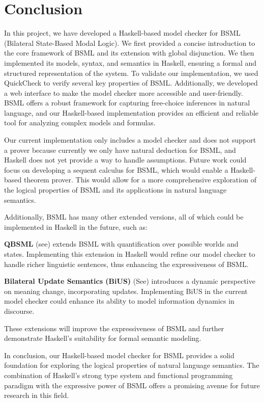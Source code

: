 \section{Conclusion}\label{sec:Conclusion}

In this project, we have developed a Haskell-based model checker for BSML (Bilateral State-Based Modal Logic). 
We first provided a concise introduction to the core framework of BSML and its extension with global disjunction.
We then implemented its models, syntax, and semantics in Haskell, ensuring a formal and structured representation of the system.\@ 
To validate our implementation, we used QuickCheck to verify several key properties of BSML.\@
Additionally, we developed a web interface to make the model checker more accessible and user-friendly.
BSML offers a robust framework for capturing free-choice inferences in natural language,
and our Haskell-based implementation provides an efficient and reliable tool for analyzing complex models and formulas.


Our current implementation only includes a model checker and does not support a prover because currently we only have natural deduction for BSML, and Haskell does not yet provide a way to handle assumptions.
Future work could focus on developing a sequent calculus for BSML, which would enable a Haskell-based theorem prover.
This would allow for a more comprehensive exploration of the logical properties of BSML and its applications in natural language semantics.

Additionally, BSML has many other extended versions, all of which could be implemented in Haskell in the future, such as:

\textbf{QBSML} (see\cite{Aloni2023}) extends BSML with quantification over possible worlds and states. Implementing this extension in Haskell would refine our model checker to handle richer linguistic sentences, thus enhancing the expressiveness of BSML.\@

\textbf{Bilateral Update Semantics (BiUS)} (See\cite{BiUS2023}) introduces a dynamic perspective on meaning change, incorporating updates. Implementing BiUS in the current model checker could enhance its ability to model information dynamics in discourse.

These extensions will improve the expressiveness of BSML and further demonstrate Haskell's suitability for formal semantic modeling.

In conclusion, our Haskell-based model checker for BSML provides a solid foundation for exploring the logical properties of natural language semantics.
The combination of Haskell's strong type system and functional programming paradigm with the expressive power of BSML offers a promising avenue for future research in this field.
